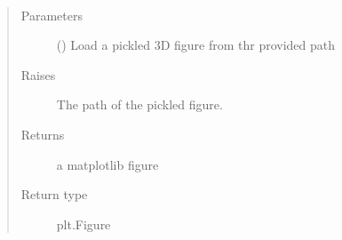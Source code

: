 \documentclass[letterpaper,10pt,english]{sphinxmanual}
\begin{document}
\begin{fulllineitems}
\label{\detokenize{IPTK.Utils:IPTK.Utils.UtilityFunction.load_3d_figure}}~\begin{quote}\begin{description}
\item[{Parameters}] \leavevmode
{} () \textendash{} Load a pickled 3D figure from thr provided path

\item[{Raises}] \leavevmode
{} \textendash{} The path of the pickled figure.

\item[{Returns}] \leavevmode
a matplotlib figure

\item[{Return type}] \leavevmode
plt.Figure

\end{description}\end{quote}

\end{fulllineitems}

\end{document}
